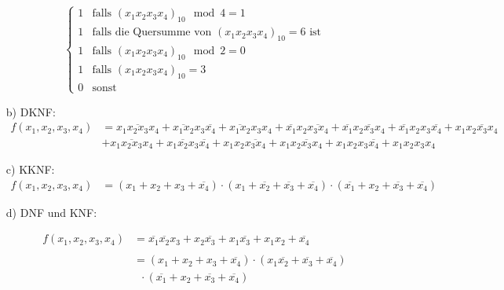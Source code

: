 \documentclass{article}
\begin{document}
\begin{itemize}
\begin{equation*}
\begin{cases}
    			1 &\text{falls } (x_1x_2x_3x_4)_{10} \mod 4 = 1 \\
    			1 &\text{falls die Quersumme von } (x_1x_2x_3x_4)_{10} = 6 \text{ ist} \\
    			1 &\text{falls } (x_1x_2x_3x_4)_{10} \mod 2 = 0 \\
    			1 &\text{falls } (x_1x_2x_3x_4)_{10} = 3 \\
    			0 &\text{sonst}
    		\end{cases}
    	\end{equation*}
    	\item[b)] DKNF:
    	\begin{align*}
    		f(x_1,x_2,x_3,x_4) &= \overline{x_1x_2x_3x_4} + \overline{x_1x_2}x_3\overline{x_4} + \overline{x_1x_2}x_3x_4 + \overline{x_1}x_2\overline{x_3x_4} + \overline{x_1}x_2\overline{x_3}x_4 + \overline{x_1}x_2x_3\overline{x_4} + x_1\overline{x_2x_3x_4} \\
    		& + x_1\overline{x_2x_3}x_4 + x_1\overline{x_2}x_3\overline{x_4} + x_1x_2\overline{x_3x_4} + x_1 x_2 \overline{x_3} x_4 + x_1x_2x_3\overline{x_4} + x_1x_2x_3x_4
    	\end{align*}
    	\item[c)] KKNF:
    	\begin{align*}
    		f(x_1,x_2,x_3,x_4) &= (x_1 + x_2 + x_3 + \overline{x_4}) \cdot (x_1 + \overline{x_2} + \overline{x_3} + \overline{x_4}) \cdot (\overline{x_1} + x_2 + \overline{x_3} + \overline{x_4})
    	\end{align*}\newpage
    	\item[d)] DNF und KNF:\newline
		\begin{minipage}[h]{0.6\textwidth}
			\vspace{-3cm}
    		\begin{align*}
    			f(x_1,x_2,x_3,x_4) &= \overline{x_1} \overline{x_2} x_3 + x_2 \overline{x_3} + x_1 \overline{x_3} + x_1 x_2 + \overline{x_4} \\\\
				&= (x_1 + x_2 + x_3 + \overline{x_4}) \cdot (x_1 \overline{x_2} + \overline{x_3} + \overline{x_4}) \\
				&\;\;\cdot (\overline{x_1} + x_2 + \overline{x_3} + \overline{x_4})
    		\end{align*}
    	\end{minipage}
    	\begin{minipage}[h]{0.3\textwidth}
			\begin{karnaugh-map}[4][4][1][$x_3x_4$][$x_1x_2$]

\end{karnaugh-map}
\end{minipage}
\end{itemize}
\end{document}
